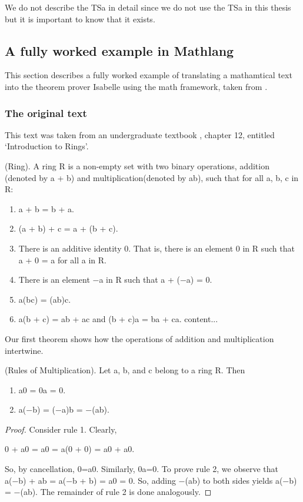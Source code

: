 We do not describe the TSa in detail since we do not use the TSa in this thesis but it is important to know that it exists.

\subsection{A fully worked example in Mathlang}

This section describes a fully worked example of translating a mathamtical text into the theorem prover Isabelle using the \gls{math} framework, taken from \cite{lamarphd}.

\subsubsection{The original text}

This text was taken from an undergraduate textbook \cite{joseph2002contemporary}, chapter 12, entitled `Introduction to Rings'.

\begin{tcolorbox}

\begin{defin}
(Ring). A ring R is a non-empty set with two binary operations, addition (denoted by a + b) and multiplication(denoted by ab), such that for all a, b, c in R:
\begin{enumerate}
\item a + b = b + a.
\item (a + b) + c = a + (b + c).
\item There is an additive identity 0. That is, there is an element 0 in R such that a + 0 = a for all a in R.
\item There is an element −a in R such that a + (−a) = 0.
\item a(bc) = (ab)c.
\item a(b + c) = ab + ac and (b + c)a = ba + ca.
content...
\end{enumerate}
Our first theorem shows how the operations of addition and
multiplication intertwine.
\end{defin}

\begin{thm}
(Rules of Multiplication). Let a, b, and c belong to a
ring R. Then
\begin{enumerate}
\item a0 = 0a = 0.
\item a(−b) = (−a)b = −(ab).
\end{enumerate}
\end{thm}

\begin{proof}
Consider rule 1. Clearly,

\begin{center}
0 + a0 = a0 = a(0 + 0) = a0 + a0.
\end{center}
So, by cancellation, 0=a0. Similarly, 0a=0.
To prove rule 2, we observe that a(−b) + ab = a(−b + b) = a0 =
0. So, adding −(ab) to both sides yields a(−b) = −(ab). The
remainder of rule 2 is done analogously.
\end{proof}
\end{tcolorbox}

